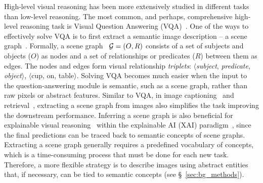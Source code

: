 High-level visual reasoning has been more extensively  studied in different tasks than low-level reasoning. The most common, and perhaps, comprehensive high-level reasoning task is Visual Question Answering (VQA)~\citep{antol2015vqa,johnson2017clevr}. One of the ways to effectively solve VQA is to first extract a semantic image description -- a scene graph~\citep{NSM2019,yi2018neural,zhang2019empirical}. 
Formally, a scene graph~\citep{johnson2015image} ${\cal G}=(O,R)$ consists of a set of subjects and objects ($O$) as nodes and a set of relationships or predicates ($R$) between them as edges. The nodes and edges form visual relationship \textit{triplets}: $\langle$\textit{subject}, \textit{predicate}, \textit{object}$\rangle$, \eg
$\langle$cup, on, table$\rangle$. %
Solving VQA becomes much easier when the input to the question-answering module is semantic, such as a scene graph, rather than raw pixels or abstract features. Similar to VQA, in image captioning~\citep{yang2019auto, gu2019unpaired} and retrieval~\citep{johnson2015image,belilovsky2017joint,tang2020unbiased}, extracting a scene graph from images also simplifies the task improving the downstream performance. Inferring a scene graph is also beneficial for explainable visual reasoning~\citep{shi2019explainable} within the explainable AI (XAI) paradigm~\citep{gunning2019darpa}, since the final predictions can be traced back to semantic concepts of scene graphs.
Extracting a scene graph generally requires a predefined vocabulary of concepts, which is a time-consuming process that must be done for each new task. Therefore, a more flexible strategy is to describe images using abstract entities~\citep{norcliffe2018learning,vedantam2019probabilistic,locatello2020object,burgess2019monet,greff2020binding} that, if necessary, can be tied to semantic concepts (see \S~\ref{sec:bg_methods}).
